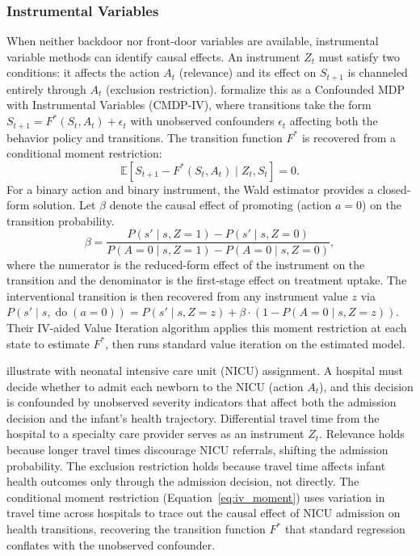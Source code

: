 \subsubsection{Instrumental Variables}
\label{subsubsec:iv}

When neither backdoor nor front-door variables are available, instrumental variable methods can identify causal effects. An instrument $Z_t$ must satisfy two conditions: it affects the action $A_t$ (relevance) and its effect on $S_{t+1}$ is channeled entirely through $A_t$ (exclusion restriction). \citet{liao2024_iv_rl} formalize this as a Confounded MDP with Instrumental Variables (CMDP-IV), where transitions take the form $S_{t+1} = F^*(S_t, A_t) + \epsilon_t$ with unobserved confounders $\epsilon_t$ affecting both the behavior policy and transitions. The transition function $F^*$ is recovered from a conditional moment restriction:
\begin{equation}
\mathbb{E}[S_{t+1} - F^*(S_t, A_t) \mid Z_t, S_t] = 0.
\label{eq:iv_moment}
\end{equation}
For a binary action and binary instrument, the Wald estimator provides a closed-form solution. Let $\beta$ denote the causal effect of promoting (action $a = 0$) on the transition probability.
\begin{equation}
\beta = \frac{P(s' \mid s, Z{=}1) - P(s' \mid s, Z{=}0)}{P(A{=}0 \mid s, Z{=}1) - P(A{=}0 \mid s, Z{=}0)},
\label{eq:wald}
\end{equation}
where the numerator is the reduced-form effect of the instrument on the transition and the denominator is the first-stage effect on treatment uptake. The interventional transition is then recovered from any instrument value $z$ via $P(s' \mid s, \operatorname{do}(a{=}0)) = P(s' \mid s, Z{=}z) + \beta \cdot (1 - P(A{=}0 \mid s, Z{=}z))$. Their IV-aided Value Iteration algorithm applies this moment restriction at each state to estimate $F^*$, then runs standard value iteration on the estimated model.

\citet{liao2024_iv_rl} illustrate with neonatal intensive care unit (NICU) assignment. A hospital must decide whether to admit each newborn to the NICU (action $A_t$), and this decision is confounded by unobserved severity indicators that affect both the admission decision and the infant's health trajectory. Differential travel time from the hospital to a specialty care provider serves as an instrument $Z_t$. Relevance holds because longer travel times discourage NICU referrals, shifting the admission probability. The exclusion restriction holds because travel time affects infant health outcomes only through the admission decision, not directly. The conditional moment restriction (Equation~\ref{eq:iv_moment}) uses variation in travel time across hospitals to trace out the causal effect of NICU admission on health transitions, recovering the transition function $F^*$ that standard regression conflates with the unobserved confounder.

